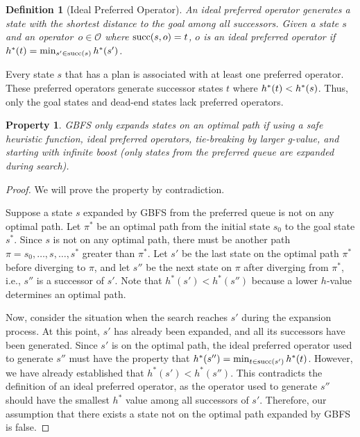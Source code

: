 \documentclass[ppgc,diss,english]{iiufrgs}
\newtheorem{definition}{Definition}
\newtheorem{property}{Property}
\begin{document}
\begin{definition}[Ideal Preferred Operator]\label{def:ideal_preferred_operator}
  An ideal preferred operator generates a state with the shortest distance to the goal among all successors. Given a state $s$ and an operator~$o \in \mathcal{O}$ where $\operatorname{succ}(s,o) = t$, $o$ is an ideal preferred operator if $h^*({t}) = \min_{s' \in \operatorname{succ}(s)} h^*({s'})$.
\end{definition}

Every state $s$ that has a plan is associated with at least one preferred operator. These preferred operators generate successor states $t$ where $h^*({t}) < h^*({s})$. Thus, only the goal states and dead-end states lack preferred operators.

\begin{property}
  \label{prop:ideal-optimal}
  GBFS only expands states on an optimal path if using a safe heuristic function, ideal preferred operators, tie-breaking by larger g-value, and starting with infinite boost (only states from the preferred queue are expanded during search).
\end{property}

\begin{proof}
We will prove the property by contradiction.

Suppose a state $s$ expanded by GBFS from the preferred queue is not on any optimal path.
Let $\pi^*$ be an optimal path from the initial state $s_0$ to the goal state $s^*$. Since $s$ is not on any optimal path, there must be another path $\pi = s_0,\ldots,s,\ldots,s^*$ greater than $\pi^*$.
Let $s'$ be the last state on the optimal path $\pi^*$ before diverging to $\pi$, and let $s''$ be the next state on $\pi$ after diverging from $\pi^*$, i.e., $s''$ is a successor of $s'$. Note that $h^*(s') < h^*(s'')$ because a lower $h$-value determines an optimal path.

Now, consider the situation when the search reaches $s'$ during the expansion process. At this point, $s'$ has already been expanded, and all its successors have been generated. Since $s'$ is on the optimal path, the ideal preferred operator used to generate $s''$ must have the property that $h^*(s'') = \min_{t \in \operatorname{succ}(s')} h^*{(t)}$. However, we have already established that $h^*(s') < h^*(s'')$. This contradicts the definition of an ideal preferred operator, as the operator used to generate $s''$ should have the smallest $h^*$ value among all successors of $s'$. Therefore, our assumption that there exists a state not on the optimal path expanded by GBFS is false.


\end{proof}
\end{document}

